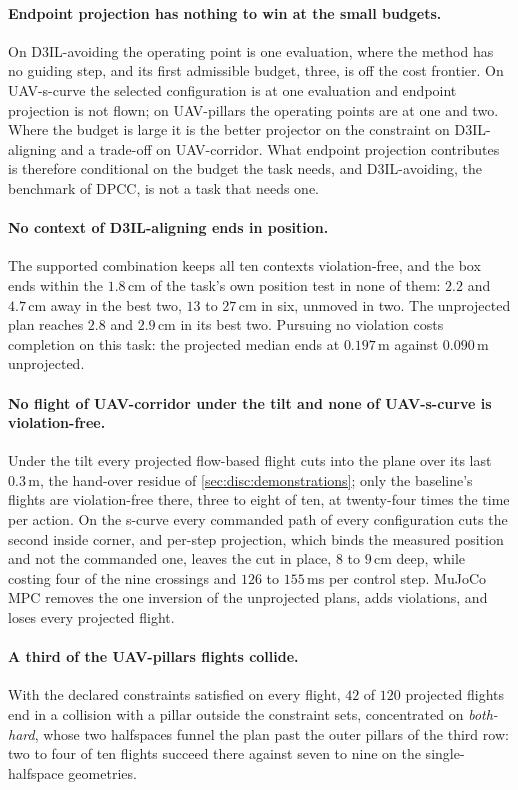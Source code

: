 \paragraph{Endpoint projection has nothing to win at the small budgets.} On D3IL-avoiding the
operating point is one evaluation, where the method has no guiding step, and its first admissible
budget, three, is off the cost frontier. On UAV-s-curve the selected configuration is at one evaluation
and endpoint projection is not flown; on UAV-pillars the operating points are at one and two. Where the
budget is large it is the better projector on the constraint on D3IL-aligning and a trade-off on
UAV-corridor. What endpoint projection contributes is therefore conditional on the budget the task
needs, and D3IL-avoiding, the benchmark of \ac{DPCC}, is not a task that needs one.

\paragraph{No context of D3IL-aligning ends in position.} The supported combination keeps all ten
contexts violation-free, and the box ends within the $1.8$\,cm of the task's own position test in none
of them: $2.2$ and $4.7$\,cm away in the best two, $13$ to $27$\,cm in six, unmoved in two. The
unprojected plan reaches $2.8$ and $2.9$\,cm in its best two. Pursuing no violation costs completion on
this task: the projected median ends at $0.197$\,m against $0.090$\,m unprojected.

\paragraph{No flight of UAV-corridor under the tilt and none of UAV-s-curve is violation-free.} Under
the tilt every projected flow-based flight cuts into the plane over its last $0.3$\,m, the hand-over
residue of \autoref{sec:disc:demonstrations}; only the baseline's flights are violation-free there,
three to eight of ten, at twenty-four times the time per action. On the s-curve every commanded path of
every configuration cuts the second inside corner, and per-step projection, which binds the measured
position and not the commanded one, leaves the cut in place, $8$ to $9$\,cm deep, while costing four of
the nine crossings and $126$ to $155$\,ms per control step. MuJoCo MPC removes the one inversion of the
unprojected plans, adds violations, and loses every projected flight.

\paragraph{A third of the UAV-pillars flights collide.} With the declared constraints satisfied on
every flight, $42$ of $120$ projected flights end in a collision with a pillar outside the constraint
sets, concentrated on \emph{both-hard}, whose two halfspaces funnel the plan past the outer pillars of
the third row: two to four of ten flights succeed there against seven to nine on the single-halfspace
geometries.

